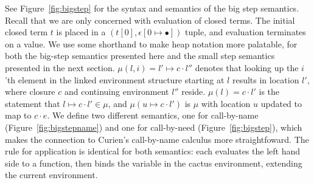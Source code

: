 See Figure~\ref{fig:bigstep} for the syntax and semantics of the \ce big step
semantics. Recall that we are only concerned with evaluation of closed terms.
The initial closed term $t$ is placed in a $(t[0],\epsilon[0 \mapsto \bullet])$
tuple, and evaluation terminates on a value. We use some shorthand to make heap
notation more palatable, for both the big-step semantics presented here and the
small step semantics presented in the next section. $\mu(l,i)=l' \mapsto c \cdot
l''$ denotes that looking up the $i$'th element in the linked
environment structure starting at $l$ results in location $l'$, where closure
$c$ and continuing environment $l''$ reside. $\mu(l) = c \cdot l'$ is the
statement that $l \mapsto c \cdot l' \in \mu$, and $\mu(u \mapsto c \cdot l')$
is $\mu$ with location $u$ updated to map to $c \cdot e$. We define two
different semantics, one for call-by-name (Figure~\ref{fig:bigstepname}) and one
for call-by-need (Figure~\ref{fig:bigstep}), which makes the connection to Curien's
call-by-name calculus more straightfoward. The rule for application is
identical for both semantics: each evaluates the left hand side to a function,
then binds the variable in the cactus environment, extending the current
environment.

